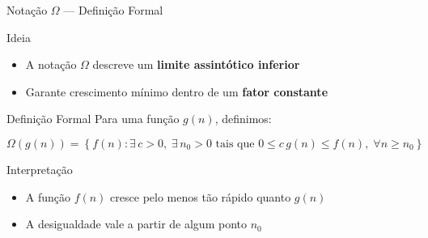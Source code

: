 \documentclass{beamer}
\begin{document}
\begin{frame}{Notação $\Omega$ — Definição Formal}

\begin{block}{Ideia}
\begin{itemize}
    \item A notação $\Omega$ descreve um \textbf{limite assintótico inferior}
    \item Garante crescimento mínimo dentro de um \textbf{fator constante}
\end{itemize}
\end{block}

\vspace{0.2cm}

\begin{block}{Definição Formal}
Para uma função $g(n)$, definimos:

\small
\[
\Omega(g(n)) = \left\{ f(n) : \exists\, c > 0,\; \exists\, n_0 > 0 \text{ tais que } 
0 \leq c\,g(n) \leq f(n),\; \forall n \geq n_0 \right\}
\]
\end{block}

\vspace{0.2cm}

\begin{alertblock}{Interpretação}
\begin{itemize}
    \item A função $f(n)$ cresce pelo menos tão rápido quanto $g(n)$
    \item A desigualdade vale a partir de algum ponto $n_0$
\end{itemize}
\end{alertblock}

\end{frame}
\end{document}
